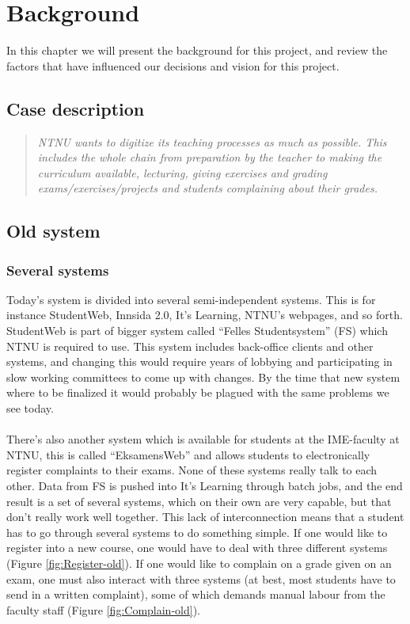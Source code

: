 \section{Background}
In this chapter we will present the background for this project, and review the factors that have
influenced our decisions and vision for this project.

\subsection{Case description}

\begin{quotation}
  \em NTNU wants to digitize its teaching processes as much as possible.
   This includes the whole chain from preparation by the teacher to making the curriculum available, lecturing, giving exercises and grading exams/exercises/projects and students complaining about their grades.
\end{quotation}

\subsection{Old system}
\subsubsection{Several systems}
Today's system is divided into several semi-independent systems. This is for instance StudentWeb, Innsida 2.0, It's Learning, NTNU's webpages, and so forth. 
StudentWeb is part of bigger system called ``Felles Studentsystem'' (FS) which NTNU is required to use. This system includes back-office clients and other systems, and changing this
would require years of lobbying and participating in slow working committees to come up with changes. By the time that new system where to be finalized it would probably be plagued with the same problems we see today.
~\\\\
 There's also another system which is available for students at the IME-faculty at NTNU, this is called ``EksamensWeb'' and allows students to electronically register complaints to 
 their exams. None of these systems really talk to each other. Data from FS is pushed into It's Learning through batch jobs, and the end result is a set of several systems, which on their own are very capable, but that don't really work well together.  
 This lack of interconnection means that a student has to go through several systems to do something simple. If one would like to register into a new course, one would have to deal with three different systems (Figure \ref{fig:Register-old}). If one would like to complain on a grade given on an exam, one must also interact with three systems (at best, most students have to send in a written complaint), some of which demands manual labour from the faculty staff (Figure \ref{fig:Complain-old}).

